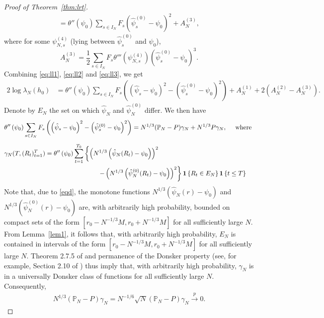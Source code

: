 \documentclass[12pt]{amsart}
\theoremstyle{plain}
\theoremstyle{remark}
\numberwithin{equation}{section}
\begin{document}
\begin{proof}[Proof of Theorem~\ref{thm:lrt}]
\begin{align}
=\theta''\left(\psi_0\right)\sum_{s \in I_N} {F}_s\left(\hat{\psi}^{(0)}_{s}-{\psi}_{0}\right)^2 + A^{(3)}_N,
\end{align}
where for some $\psi^{(4)}_{N,s}$ (lying between $\hat{\psi}^{(0)}_{s}$ and $\psi_0$),
\[
   A^{(3)}_N = \frac{1}{2}\sum_{s \in I_N} {F}_s\theta'''\left(\psi^{(4)}_{N,s}\right)\left(\hat{\psi}^{(0)}_{s}-\psi_0\right)^3.
\]
Combining \eqref{eq:ll1}, \eqref{eq:ll2} and \eqref{eq:ll3}, we get
\begin{align}\label{eq:ll4}
    2 \log \lambda_{N}(h_0) &= 
\theta''\left(\psi_0\right)\sum_{s \in I_N} {F}_s\left(\left(\hat{\psi}_{s}-\psi_0\right)^2-\left(\hat{\psi}_{s}^{(0)}-\psi_0\right)^2\right) + A^{(1)}_N +2(A^{(2)}_N - A^{(3)}_N).
\end{align}
Denote by $E_{N}$ the set on which $\hat{\psi}_{N}$ and $\hat{\psi}_{N}^{(0)}$ differ. We then have 
\begin{align}\label{eq:ll5}
& \theta''\left(\psi_0\right)\sum_{s \in I_N} {F}_s\left(\left(\hat{\psi}_{s}-\psi_0\right)^2-\left(\hat{\psi}_{s}^{(0)}-\psi_0\right)^2\right) = N^{1/3}(\mathbb{P}_N-P)\gamma_{N} + N^{1/3}P\gamma_{N},
\quad \text{ where } \nonumber
    \\[.15cm] &\gamma_{N}(T, (R_t)_{t=1}^{T}) = \theta''\left(\psi_0\right)\sum_{t=1}^{T_0}\left\{\left(N^{1/3}\left(\hat{\psi}_{N}(R_t)-\psi_0\right)\right)^{2} \right.\\ &\hspace{5.15cm}\left. -\left(N^{1/3}\left(\hat{\psi}_{N}^{(0)}(R_t)-\psi_0\right)\right)^{2}\right\}\mathbf{1}\left\{R_t \in E_{N}\right\}\mathbf{1}\left\{t \leq T\right\} \nonumber
\end{align}
Note that, due to \eqref{eqd}, the monotone functions $N^{1/3}\left(\hat{\psi}_N(r) - \psi_0\right)$ and $N^{1/3}\left(\hat{\psi}_N^{(0)}(r) - \psi_0\right)$ are, with arbitrarily high probability, bounded on compact sets of the form $[r_0 - N^{-1/3}M, r_0 + N^{-1/3}M]$ for all sufficiently large $N$. From Lemma~\ref{lem1}, it follows that, 
with arbitrarily high probability, $E_N$ is contained in intervals of the form $[r_0 - N^{-1/3}M, r_0 + N^{-1/3}M]$ for all sufficiently large $N$. Theorem 2.7.5 of \cite{MR1385671} and permanence of the Donsker property (see, for example, Section 2.10 of \cite{MR1385671}) thus imply that, with arbitrarily high probability, $\gamma_N$ is in a universally Donsker class of functions for all sufficiently large $N$. Consequently, 
\begin{align}\label{eq:ll6}
N^{1/3}(\mathbb{P}_N-P)\gamma_{N} = N^{-1/6}\sqrt{N}(\mathbb{P}_N-P)\gamma_{N} \stackrel{p}{\to} 0.

\end{align}
\end{proof}
\end{document}
